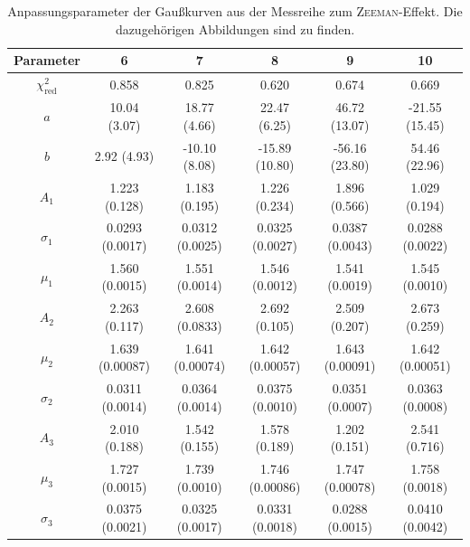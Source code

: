 \begin{table}[ht]
    \vspace{1em}
    \begin{tabular}{c *{5}{c}}
        \toprule
        Parameter & {6} & {7} & {8} & {9} & {10} \\
        \midrule
        $\chi_\text{red}^2$ & 0.858 & 0.825 & 0.620 & 0.674 & 0.669 \\
        $a$         & 10.04 (3.07)      & 18.77 (4.66)      & 22.47 (6.25)      & 46.72 (13.07)     & -21.55 (15.45) \\
        $b$         & 2.92 (4.93)       & -10.10 (8.08)     & -15.89 (10.80)    & -56.16 (23.80)    & 54.46 (22.96) \\
        $A_1$       & 1.223 (0.128)     & 1.183 (0.195)     & 1.226 (0.234)     & 1.896 (0.566)     & 1.029 (0.194) \\
        $\sigma_1$  & 0.0293 (0.0017)   & 0.0312 (0.0025)   & 0.0325 (0.0027)   & 0.0387 (0.0043)   & 0.0288 (0.0022) \\
        $\mu_1$     & 1.560 (0.0015)    & 1.551 (0.0014)    & 1.546 (0.0012)    & 1.541 (0.0019)    & 1.545 (0.0010) \\
        $A_2$       & 2.263 (0.117)     & 2.608 (0.0833)    & 2.692 (0.105)     & 2.509 (0.207)     & 2.673 (0.259) \\
        $\mu_2$     & 1.639 (0.00087)   & 1.641 (0.00074)   & 1.642 (0.00057)   & 1.643 (0.00091)   & 1.642 (0.00051) \\
        $\sigma_2$  & 0.0311 (0.0014)   & 0.0364 (0.0014)   & 0.0375 (0.0010)   & 0.0351 (0.0007)   & 0.0363 (0.0008) \\
        $A_3$       & 2.010 (0.188)     & 1.542 (0.155)     & 1.578 (0.189)     & 1.202 (0.151)     & 2.541 (0.716) \\
        $\mu_3$     & 1.727 (0.0015)    & 1.739 (0.0010)    & 1.746 (0.00086)   & 1.747 (0.00078)   & 1.758 (0.0018) \\
        $\sigma_3$  & 0.0375 (0.0021)   & 0.0325 (0.0017)   & 0.0331 (0.0018)   & 0.0288 (0.0015)   & 0.0410 (0.0042) \\
        \bottomrule
    \end{tabular}
    \caption[Anpassungsparameter zur Messreihe \textsc{Zeeman}-Effekt]{Anpassungsparameter der Gaußkurven aus der Messreihe zum \textsc{Zeeman}-Effekt. Die dazugehörigen Abbildungen sind  zu finden.}\label{tab:langzeeman-fit}
\end{table}
\normalsize
